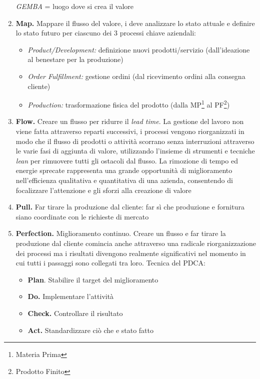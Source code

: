 \begin{enumerate}
		\textit{GEMBA} = luogo dove si crea il valore
	\item \textbf{Map.} Mappare il flusso del valore, i deve analizzare lo stato attuale e definire lo stato futuro per ciascuno dei 3 processi chiave aziendali:
		\begin{itemize}
			\item \textit{Product/Development:} definizione nuovi prodotti/servizio (dall’ideazione al benestare per la produzione)
			\item \textit{Order Fulfillment:} gestione ordini (dal ricevimento ordini alla consegna cliente)
			\item \textit{Production:} trasformazione fisica del prodotto (dalla MP\footnote{Materia Prima} al PF\footnote{Prodotto Finito})
		\end{itemize}
	\item \textbf{Flow.} Creare un flusso per ridurre il \textit{lead time}. La gestione del lavoro non viene fatta attraverso reparti successivi, i processi vengono riorganizzati in modo che il flusso di prodotti o attività scorrano senza interruzioni attraverso le varie fasi di aggiunta di valore, utilizzando l’insieme di strumenti e tecniche \textit{lean} per rimuovere tutti gli ostacoli dal flusso. La rimozione di tempo ed energie sprecate rappresenta una grande opportunità di miglioramento nell’efficienza qualitativa e quantitativa di una azienda, consentendo di focalizzare l’attenzione e gli sforzi alla creazione di valore
	\item \textbf{Pull.} Far tirare la produzione dal cliente: far sì che produzione e fornitura siano coordinate con le richieste di mercato
	\item \textbf{Perfection.} Miglioramento continuo. Creare un flusso e far tirare la produzione dal cliente comincia anche attraverso una radicale riorganizzazione dei processi ma i risultati divengono realmente significativi nel momento in cui tutti i passaggi sono collegati tra loro. Tecnica del PDCA:
		\begin{itemize}
			\item \textbf{Plan}. Stabilire il target del miglioramento
			\item \textbf{Do.} Implementare l’attività
			\item \textbf{Check.} Controllare il risultato
			\item \textbf{Act.} Standardizzare ciò che e stato fatto
		\end{itemize}
\end{enumerate}






